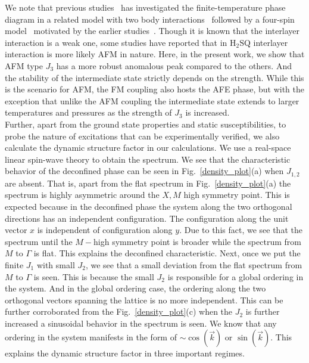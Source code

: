 \indent  We note that previous studies~\cite{vijigiri2020dipole,ishizuka2011quantum} has investigated the finite-temperature phase diagram in a related model with two body interactions~\cite{ishizuka2011quantum} followed by a four-spin model~\cite{vijigiri2020dipole,chern2014gauge} motivated by the earlier studies~\cite{maier1982interacting}. Though it is known that the interlayer interaction is a weak one, some studies have reported that in $\text{H}_2\text{SQ}$ interlayer interaction is more likely AFM in nature. Here, in the present work, we show that AFM type $J_3$ has a more robust anomalous peak compared to the others. And the stability of the intermediate state strictly depends on the strength. While this is the scenario for AFM, the FM coupling also hosts the AFE phase, but with the exception that unlike the AFM coupling the intermediate state extends to larger temperatures and pressures as the strength of $J_3$ is increased. \\
\indent Further, apart from the ground state properties and static susceptibilities, to probe the nature of excitations that can be experimentally verified, we also calculate the dynamic structure factor in our calculations. We use a real-space linear spin-wave theory to obtain the spectrum. We see that the characteristic behavior of the deconfined phase can be seen in Fig.~\ref{density_plot}(a) when $J_{1,2}$ are absent. That is, apart from the flat spectrum in Fig.~\ref{density_plot}(a) the spectrum is highly asymmetric around the $X, M$ high symmetry point. This is expected because in the deconfined phase the system along the two orthogonal directions has an independent configuration. The configuration along the unit vector $x$ is independent of configuration along $y$. Due to this fact, we see that the spectrum until the $M-$high symmetry point is broader while the spectrum from $M$ to $\Gamma$ is flat. This explains the deconfined characteristic. Next, once we put the finite $J_1$ with small $J_2$, we see that a small deviation from the flat spectrum from $M$ to $\Gamma$ is seen. This is because the small $J_2$ is responsible for a global ordering in the system. And in the global ordering case, the ordering along the two orthogonal vectors spanning the lattice is no more independent. This can be further corroborated from the Fig.~\ref{density_plot}(c) when the $J_2$ is further increased a sinusoidal behavior in the spectrum is seen. We know that any ordering in the system manifests in the form of $\sim \cos(\vec{k})$ or $\sin(\vec{k})$. This explains the dynamic structure factor in three important regimes.
